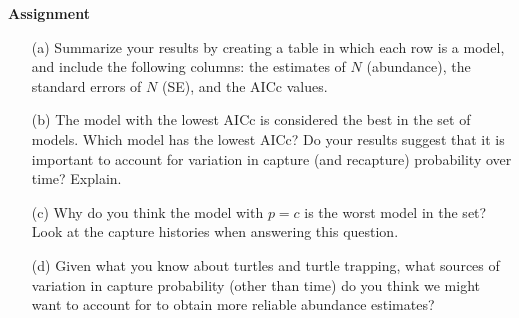 \documentclass[12pt]{article}
\begin{document}
{\bf Assignment}

\begin{enumerate}
  \item[(a)] Summarize your results by creating a table in which each row
    is a model, and include the following columns: the estimates of $N$
    (abundance), the standard errors of $N$ (SE), and the AICc
    values. 
  \item[(b)] The model with the lowest AICc is considered the best in
    the set of models. Which model has the lowest AICc? Do your
    results suggest that it is important to account for variation in
    capture (and recapture) probability over time? Explain.
  \item[(c)] Why do you think the model with $p=c$ is the worst model
    in the set? Look at the capture histories when answering this
    question. 
  \item[(d)] Given what you know about turtles and turtle trapping,
    what sources of variation in capture probability (other than time)
    do you think we might want to account for to obtain more reliable
    abundance estimates?
\end{enumerate}
\end{document}
